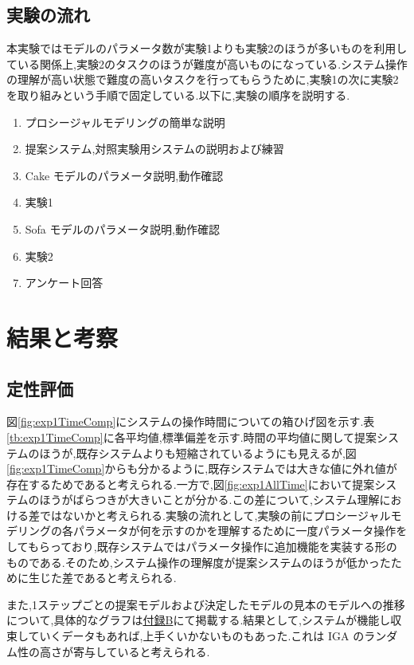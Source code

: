 \subsection{実験の流れ}
本実験ではモデルのパラメータ数が実験1よりも実験2のほうが多いものを利用している関係上,実験2のタスクのほうが難度が高いものになっている.システム操作の理解が高い状態で難度の高いタスクを行ってもらうために,実験1の次に実験2を取り組みという手順で固定している.以下に,実験の順序を説明する.

\begin{enumerate}
    \item プロシージャルモデリングの簡単な説明
    \item 提案システム,対照実験用システムの説明および練習
    \item Cake モデルのパラメータ説明,動作確認
    \item 実験1
    \item Sofa モデルのパラメータ説明,動作確認
    \item 実験2
    \item アンケート回答
\end{enumerate}

\clearpage
\section{結果と考察}
\subsection{定性評価}
図\ref{fig:exp1TimeComp}にシステムの操作時間についての箱ひげ図を示す.表\ref{tb:exp1TimeComp}に各平均値,標準偏差を示す.時間の平均値に関して提案システムのほうが,既存システムよりも短縮されているようにも見えるが,図\ref{fig:exp1TimeComp}からも分かるように,既存システムでは大きな値に外れ値が存在するためであると考えられる.一方で,図\ref{fig:exp1AllTime}において提案システムのほうがばらつきが大きいことが分かる.この差について,システム理解における差ではないかと考えられる.実験の流れとして,実験の前にプロシージャルモデリングの各パラメータが何を示すのかを理解するために一度パラメータ操作をしてもらっており,既存システムではパラメータ操作に追加機能を実装する形のものである.そのため,システム操作の理解度が提案システムのほうが低かったために生じた差であると考えられる.


また,1ステップごとの提案モデルおよび決定したモデルの見本のモデルへの推移について,具体的なグラフは\hyperref[appendix:gaChange]{付録B}にて掲載する.結果として,システムが機能し収束していくデータもあれば,上手くいかないものもあった.これは IGA のランダム性の高さが寄与していると考えられる.



